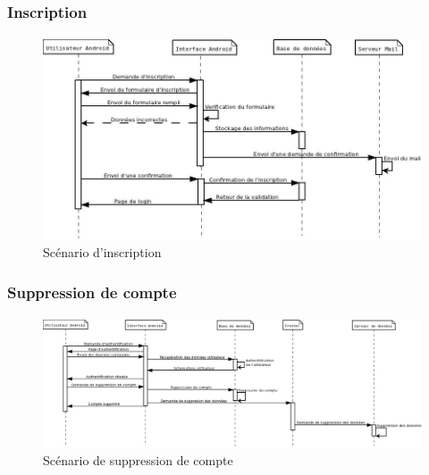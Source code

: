 \documentclass[a4paper,12pt]{article}
\begin{document}
\subsubsection{Inscription}
\paragraph{}
\begin{figure}[!ht]
\begin{center}
  \includegraphics[width=1\textwidth, angle=90]{./Diagramme/Android/CompteInscription.jpg}
\end{center}
  \caption{Scénario d'inscription}
  \label{androidRegister}
\end{figure}

\newpage
\subsubsection{Suppression de compte}
\paragraph{}
\begin{figure}[!ht]
\begin{center}
  \includegraphics[width=1\textwidth, angle=90]{./Diagramme/Android/CompteSuppression.jpg}
\end{center}
  \caption{Scénario de suppression de compte}
  \label{androidDeleteAccount}
\end{figure}
\end{document}
